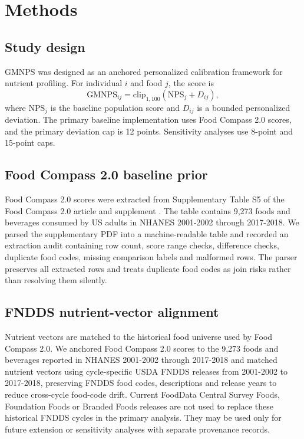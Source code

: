 \section*{Methods}

\subsection*{Study design}

GMNPS was designed as an anchored personalized calibration framework for
nutrient profiling. For individual \(i\) and food \(j\), the score is
\[
  \mathrm{GMNPS}_{ij} = \mathrm{clip}_{1,100}\left(\mathrm{NPS}_{j} + D_{ij}\right),
\]
where \(\mathrm{NPS}_{j}\) is the baseline population score and \(D_{ij}\) is a
bounded personalized deviation. The primary baseline implementation uses Food
Compass 2.0 scores, and the primary deviation cap is 12 points. Sensitivity
analyses use 8-point and 15-point caps.

\subsection*{Food Compass 2.0 baseline prior}

Food Compass 2.0 scores were extracted from Supplementary Table S5 of the
Food Compass 2.0 article and supplement \cite{barrett2024foodcompass2}. The table contains
9,273 foods and beverages consumed by US adults in NHANES 2001-2002 through
2017-2018. We parsed the supplementary PDF into a machine-readable table and
recorded an extraction audit containing row count, score range checks,
difference checks, duplicate food codes, missing comparison labels and malformed
rows. The parser preserves all extracted rows and treats duplicate food codes as
join risks rather than resolving them silently.

\subsection*{FNDDS nutrient-vector alignment}

Nutrient vectors are matched to the historical food universe used by Food
Compass 2.0. We anchored Food Compass 2.0 scores to the 9,273 foods and
beverages reported in NHANES 2001-2002 through 2017-2018 and matched nutrient
vectors using cycle-specific USDA FNDDS releases from 2001-2002 to 2017-2018,
preserving FNDDS food codes, descriptions and release years to reduce
cross-cycle food-code drift. Current FoodData Central Survey Foods, Foundation
Foods or Branded Foods releases are not used to replace these historical FNDDS
cycles in the primary analysis. They may be used only for future extension or
sensitivity analyses with separate provenance records.

